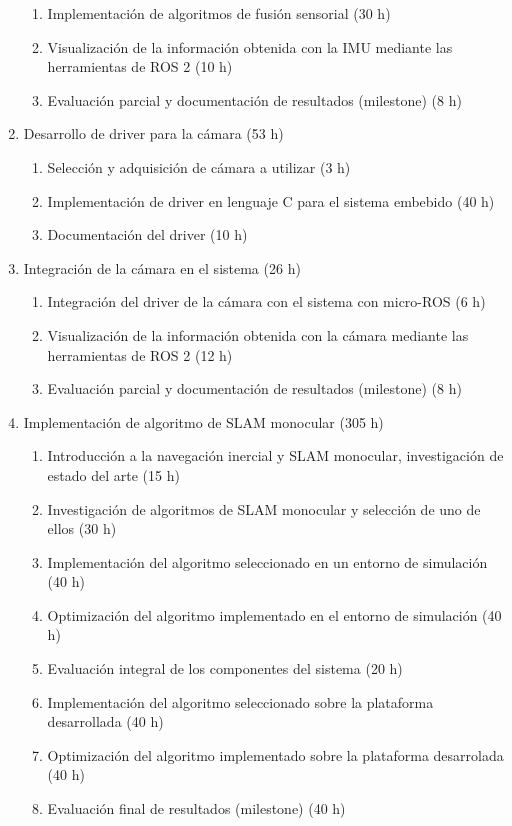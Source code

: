 \documentclass[
11pt, %
codirector, %
]{charter}
\begin{document}
\begin{enumerate}
\begin{enumerate}
		\item Implementación de algoritmos de fusión sensorial (30 h)
		\item Visualización de la información obtenida con la IMU mediante las herramientas de ROS 2 (10 h)
		\item Evaluación parcial y documentación de resultados (milestone) (8 h)
	\end{enumerate}
	\item Desarrollo de driver para la cámara (53 h)
	\begin{enumerate}
		\item Selección y adquisición de cámara a utilizar (3 h)
		\item Implementación de driver en lenguaje C para el sistema embebido (40 h)
		\item Documentación del driver (10 h)
	\end{enumerate}
	\item Integración de la cámara en el sistema (26 h)
	\begin{enumerate}
		\item Integración del driver de la cámara con el sistema con micro-ROS (6 h)
		\item Visualización de la información obtenida con la cámara mediante las herramientas de ROS 2 (12 h)
		\item Evaluación parcial y documentación de resultados (milestone) (8 h)
	\end{enumerate}
	\item Implementación de algoritmo de SLAM monocular (305 h)
	\begin{enumerate}
		\item Introducción a la navegación inercial y SLAM monocular, investigación de estado del arte (15 h)
		\item Investigación de algoritmos de SLAM monocular y selección de uno de ellos (30 h)
		\item Implementación del algoritmo seleccionado en un entorno de simulación (40 h)
		\item Optimización del algoritmo implementado en el entorno de simulación (40 h)
		\item Evaluación integral de los componentes del sistema (20 h)
		\item Implementación del algoritmo seleccionado sobre la plataforma desarrollada (40 h)
		\item Optimización del algoritmo implementado sobre la plataforma desarrolada (40 h)
		\item Evaluación final de resultados (milestone) (40 h)

\end{enumerate}
\end{enumerate}
\end{document}
